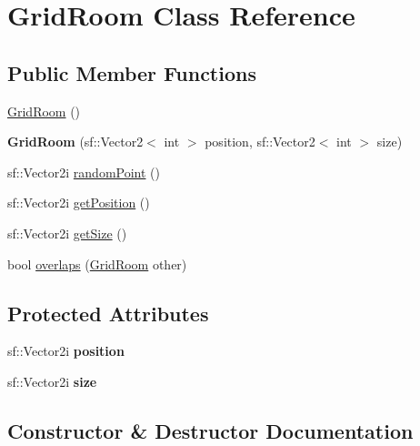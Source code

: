 \hypertarget{classGridRoom}{}\section{Grid\+Room Class Reference}
\label{classGridRoom}
\subsection*{Public Member Functions}
\begin{DoxyCompactItemize}
\item 
\hyperlink{classGridRoom_ab5605c38ba37778459b38bd53bda53c9}{Grid\+Room} ()
\item 
\mbox{\label{classGridRoom_a991a5ac52b702875fbcd8e9ca083b47e}} 
{\bfseries Grid\+Room} (sf\+::\+Vector2$<$ int $>$ position, sf\+::\+Vector2$<$ int $>$ size)
\item 
sf\+::\+Vector2i \hyperlink{classGridRoom_a9ba94d43f72a42d82c75dfb72debe617}{random\+Point} ()
\item 
sf\+::\+Vector2i \hyperlink{classGridRoom_a9bbbc4f711ae7c40633d54eafe1cb792}{get\+Position} ()
\item 
sf\+::\+Vector2i \hyperlink{classGridRoom_a5c5dc96b8f2a29220ffa654f1aa30bac}{get\+Size} ()
\item 
bool \hyperlink{classGridRoom_a5d0d7081a46dae2c15dd3f2935387450}{overlaps} (\hyperlink{classGridRoom}{Grid\+Room} other)
\end{DoxyCompactItemize}
\subsection*{Protected Attributes}
\begin{DoxyCompactItemize}
\item 
\mbox{\label{classGridRoom_a3a2d910f1d5cec03156f02374801abb6}} 
sf\+::\+Vector2i {\bfseries position}
\item 
\mbox{\label{classGridRoom_a9a72df53caecff6edadeb21d32f9744c}} 
sf\+::\+Vector2i {\bfseries size}
\end{DoxyCompactItemize}


\subsection{Constructor \& Destructor Documentation}
\mbox{\label{classGridRoom_ab5605c38ba37778459b38bd53bda53c9}} 
